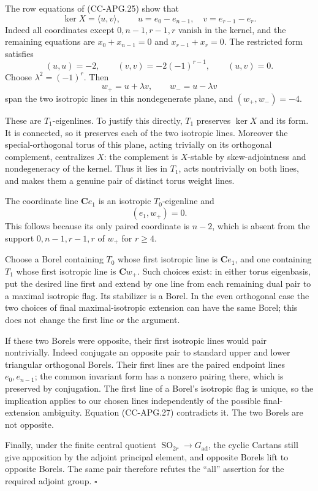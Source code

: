 \documentclass[11pt,a4paper]{article}
\theoremstyle{definition}\newtheorem{definition}[theorem]{Definition}
\theoremstyle{remark}\newtheorem{remark}[theorem]{Remark}
\begin{document}
The row equations of (CC-APG.25) show that \[
 \ker X=\langle u,v\rangle,\qquad
 u=e_0-e_{n-1},\quad v=e_{r-1}-e_r.
 \tag{CC-APG.26}
\] Indeed all coordinates except \(0,n-1,r-1,r\) vanish in the kernel,
and the remaining equations are \(x_0+x_{n-1}=0\) and \(x_{r-1}+x_r=0\).
The restricted form satisfies \[
 (u,u)=-2,\qquad
 (v,v)=-2(-1)^{r-1},\qquad(u,v)=0.
\] Choose \(\lambda^2=(-1)^r\). Then \[
 w_+=u+\lambda v,\qquad w_-=u-\lambda v
\] span the two isotropic lines in this nondegenerate plane, and
\((w_+,w_-)=-4\).

These are \(T_1\)-eigenlines. To justify this directly, \(T_1\)
preserves \(\ker X\) and its form. It is connected, so it preserves each
of the two isotropic lines. Moreover the special-orthogonal torus of
this plane, acting trivially on its orthogonal complement, centralizes
\(X\): the complement is \(X\)-stable by skew-adjointness and
nondegeneracy of the kernel. Thus it lies in \(T_1\), acts nontrivially
on both lines, and makes them a genuine pair of distinct torus weight
lines.

The coordinate line \(\mathbf Ce_1\) is an isotropic \(T_0\)-eigenline
and \[
 (e_1,w_+)=0.
 \tag{CC-APG.27}
\] This follows because its only paired coordinate is \(n-2\), which is
absent from the support \(0,n-1,r-1,r\) of \(w_+\) for \(r\geq4\).

Choose a Borel containing \(T_0\) whose first isotropic line is
\(\mathbf Ce_1\), and one containing \(T_1\) whose first isotropic line
is \(\mathbf Cw_+\). Such choices exist: in either torus eigenbasis, put
the desired line first and extend by one line from each remaining dual
pair to a maximal isotropic flag. Its stabilizer is a Borel. In the even
orthogonal case the two choices of final maximal-isotropic extension can
have the same Borel; this does not change the first line or the
argument.

If these two Borels were opposite, their first isotropic lines would
pair nontrivially. Indeed conjugate an opposite pair to standard upper
and lower triangular orthogonal Borels. Their first lines are the paired
endpoint lines \(e_0,e_{n-1}\); the common invariant form has a nonzero
pairing there, which is preserved by conjugation. The first line of a
Borel's isotropic flag is unique, so the implication applies to our
chosen lines independently of the possible final-extension ambiguity.
Equation (CC-APG.27) contradicts it. The two Borels are not opposite.

Finally, under the finite central quotient
\(\operatorname{SO}_{2r}\to G_{\mathrm{ad}}\), the cyclic Cartans still
give apposition by the adjoint principal element, and opposite Borels
lift to opposite Borels. The same pair therefore refutes the ``all''
assertion for the required adjoint group. \(\square\)
\end{document}
